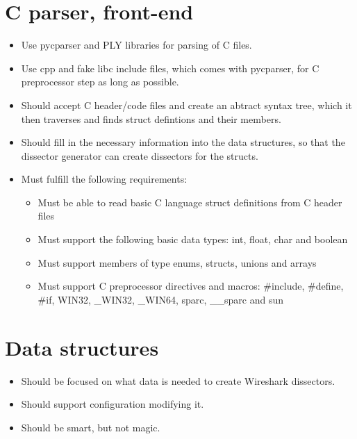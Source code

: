 \section{C parser, front-end}
\begin{itemize}
	\item Use pycparser and PLY libraries for parsing of C files.
	\item Use cpp and fake libc include files, which comes with pycparser, for C preprocessor step as long as possible.
	\item Should accept C header/code files and create an abtract syntax tree, which it then traverses and finds struct defintions and their members.
	\item Should fill in the necessary information into the data structures, so that the dissector generator can create dissectors for the structs.
	\item Must fulfill the following requirements:
	\begin{itemize}
		\item Must be able to read basic C language struct definitions from C header files
		\item Must support the following basic data types: int, float, char and boolean
		\item Must support members of type enums, structs, unions and arrays
    		\item Must support C preprocessor directives and macros: \#include, \#define, \#if, WIN32, \_WIN32, \_WIN64, sparc, \_\_sparc and sun
	\end{itemize}
\end{itemize}

\section{Data structures}
\begin{itemize}
	\item Should be focused on what data is needed to create Wireshark dissectors.
	\item Should support configuration modifying it.
	\item Should be smart, but not magic.
\end{itemize}


